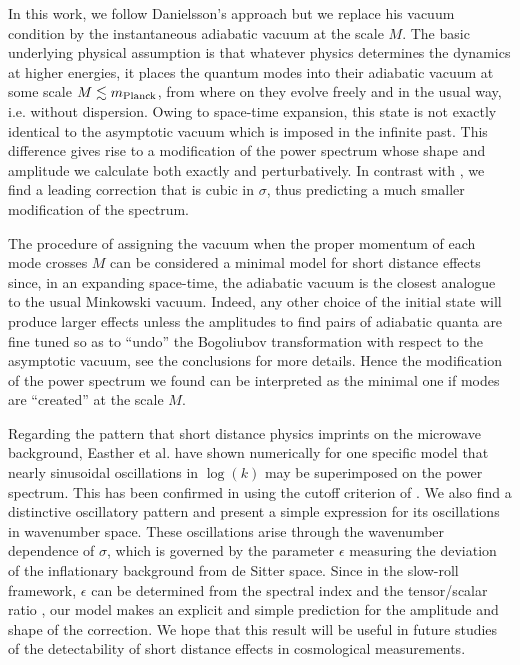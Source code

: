 \documentclass[a4paper,aps,prd,preprint,groupedaddress,nofootinbib]{revtex4}
\begin{document}
In this work, we follow Danielsson's approach but we replace his
vacuum condition  by the instantaneous adiabatic vacuum at the scale
$M$.  The basic underlying physical assumption is that whatever
physics determines the dynamics at higher energies, it places the quantum
modes into their adiabatic vacuum at  some scale $M \lesssim m_{\rm
Planck}$, from where on they evolve freely and in the usual way,
i.e. without dispersion.  Owing to space-time expansion, this state is
not exactly identical to the asymptotic vacuum which is imposed in the
infinite past. This difference gives rise to a modification of the
power spectrum whose shape and amplitude we calculate both exactly and
perturbatively. In contrast with \cite{D02,Eea02}, we find a leading
correction that is cubic in $\sigma$, thus predicting a much smaller
modification of the spectrum.

The procedure of assigning the vacuum when the proper momentum of each
mode crosses $M$ can be considered a minimal model for short distance
effects since, in an expanding space-time, 
the adiabatic vacuum is the closest analogue to the
usual Minkowski vacuum.  Indeed, any other
choice of the initial state will  produce larger effects  unless
the amplitudes to find pairs of adiabatic quanta are fine tuned so as
to ``undo'' the Bogoliubov transformation with respect to the
asymptotic  vacuum, see the conclusions for more details.  Hence the
modification of the power spectrum we found  can be interpreted as the
minimal one if modes are ``created'' at the scale $M$.

Regarding the pattern that short distance physics
imprints on the microwave background, Easther et al. \cite{Eea01b}
have shown numerically for one specific model that nearly sinusoidal
oscillations in $\log(k)$ may be superimposed on the power
spectrum. This has been confirmed in \cite{Eea02} using the cutoff
criterion of \cite{D02}. We also find a distinctive oscillatory
pattern and present a simple expression for its oscillations in
wavenumber space. These oscillations arise through the wavenumber
dependence of $\sigma$, which is governed by the parameter $\epsilon$    
measuring the deviation of the inflationary background from de
Sitter space. Since in the slow-roll framework, $\epsilon$ can be
determined from the spectral index and the tensor/scalar ratio
\cite{K98b}, our model makes an explicit and  
simple prediction for the amplitude and shape of the correction. We
hope that this result will be useful in future studies of the
detectability of short distance effects in cosmological measurements.
\end{document}
